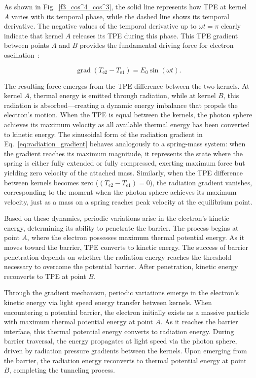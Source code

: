 \documentclass[%
 reprint,
 amsmath,amssymb,
 aps,
]{revtex4-1}
\numberwithin{equation}{section}%
\begin{document}
As shown in Fig.~\ref{f3_cos^4_cos^3}, the solid line represents how TPE at kernel $A$ varies with its temporal phase, while the dashed line shows its temporal derivative. The negative values of the temporal derivative up to $\omega t = \pi$ clearly indicate that kernel $A$ releases its TPE during this phase. This TPE gradient between points $A$ and $B$ provides the fundamental driving force for electron oscillation~\cite{hanamura2023}:

\begin{equation}
\operatorname{grad}(T_{\mathrm{e2}} - T_{\mathrm{e1}}) = E_0\sin(\omega t).
\label{eq:radiation_gradient}
\end{equation}

The resulting force emerges from the TPE difference between the two kernels. At kernel $A$, thermal energy is emitted through radiation, while at kernel $B$, this radiation is absorbed---creating a dynamic energy imbalance that propels the electron's motion. When the TPE is equal between the kernels, the photon sphere achieves its maximum velocity as all available thermal energy has been converted to kinetic energy. The sinusoidal form of the radiation gradient in Eq.~\ref{eq:radiation_gradient} behaves analogously to a spring-mass system: when the gradient reaches its maximum magnitude, it represents the state where the spring is either fully extended or fully compressed, exerting maximum force but yielding zero velocity of the attached mass. Similarly, when the TPE difference between kernels becomes zero ($(T_{e2} - T_{e1}) = 0$), the radiation gradient vanishes, corresponding to the moment when the photon sphere achieves its maximum velocity, just as a mass on a spring reaches peak velocity at the equilibrium point.

Based on these dynamics, periodic variations arise in the electron's kinetic energy, determining its ability to penetrate the barrier. The process begins at point $A$, where the electron possesses maximum thermal potential energy. As it moves toward the barrier, TPE converts to kinetic energy. The success of barrier penetration depends on whether the radiation energy reaches the threshold necessary to overcome the potential barrier. After penetration, kinetic energy reconverts to TPE at point $B$.

Through the gradient mechanism, periodic variations emerge in the electron's kinetic energy via light speed energy transfer between kernels. When encountering a potential barrier, the electron initially exists as a massive particle with maximum thermal potential energy at point $A$. As it reaches the barrier interface, this thermal potential energy converts to radiation energy. During barrier traversal, the energy propagates at light speed via the photon sphere, driven by radiation pressure gradients between the kernels. Upon emerging from the barrier, the radiation energy reconverts to thermal potential energy at point $B$, completing the tunneling process.
\end{document}
